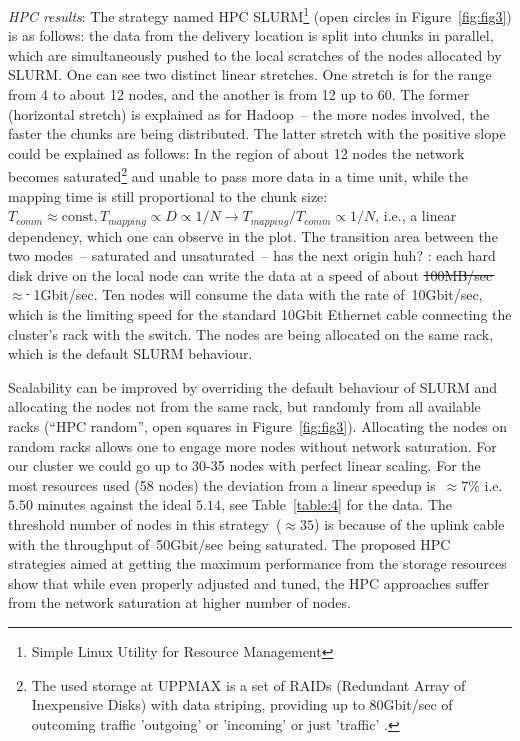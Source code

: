 \documentclass[11pt, oneside]{article}   	%
\newcommand{\COMMENT}[1]{{\color{red} #1 }}
\begin{document}
\textit{HPC results}: The strategy named HPC SLURM\footnote{Simple Linux Utility for Resource Management}  (open circles in Figure~\ref{fig:fig3}) is as follows: the data from the delivery location is split into chunks in parallel, which are simultaneously pushed to the local scratches of the nodes allocated by SLURM. One can see two distinct linear stretches. One stretch is for the range from 4 to about 12 nodes, and the another is from 12 up to 60. The former (horizontal stretch) is explained as for Hadoop~-- the more nodes involved, the faster the chunks are being distributed. The latter stretch with the positive slope could be explained as follows: In the region of about 12 nodes the network becomes saturated\footnote{The used storage at UPPMAX is a set of RAIDs (Redundant Array of Inexpensive Disks) with data striping, providing up to $80$Gbit/sec of outcoming traffic \COMMENT{'outgoing' or 'incoming' or just 'traffic'}.} and unable to pass more data in a time unit, while the mapping time is still proportional to the chunk size:~$T_{comm}\approx\mbox{const}, T_{mapping}\propto D\propto 1/N \rightarrow T_{mapping}/T_{comm}\propto 1/N$, i.e., a linear dependency, which one can observe in the plot. 
The transition area between the two modes~-- saturated and unsaturated~-- has the next origin \COMMENT{huh?}: each hard disk drive on the local node can write the data at a speed of about \sout{100MB/sec\,$\approx$\,} 1Gbit/sec. Ten nodes will consume the data with the rate of~10Gbit/sec, which is the limiting speed for the standard 10Gbit Ethernet cable connecting the cluster's rack with the switch. The nodes are being allocated on the same rack, which is the default SLURM behaviour.

Scalability can be improved by overriding the default behaviour of SLURM and allocating the nodes not from the same rack, but randomly from all available racks (``HPC random'', open squares in Figure~\ref{fig:fig3}). Allocating the nodes on random racks allows one to engage more nodes without network saturation. For our cluster we could go up to 30-35 nodes with perfect linear scaling. For the most resources used (58 nodes) the deviation from a linear speedup is~$\approx 7\%$ i.e. $5.50$ minutes against the ideal $5.14$, see Table~\ref{table:4}  for the data. The threshold number of nodes in this strategy~($\approx35$) is because of the uplink cable with the throughput of~50Gbit/sec being saturated. 
The proposed HPC strategies aimed at getting the maximum performance from the storage resources show that while even properly adjusted and tuned, the HPC approaches suffer from the network saturation at higher number of nodes.
\end{document}
